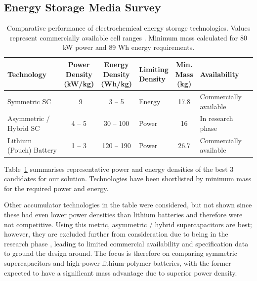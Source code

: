 \documentclass[11pt, a4paper]{report}
\numberwithin{equation}{section}
\begin{document}
\subsection{Energy Storage Media Survey}

\begin{table}[htbp]
    \centering
    \caption{Comparative performance of electrochemical energy storage technologies. Values represent commercially available cell ranges \cite{kalaiarasi2024tale}. Minimum mass calculated for 80 kW power and 89 Wh energy requirements.}
    \label{tab:storage_comparison}
    \footnotesize
    \begin{tabular}{|l|c|c|l|c|l|}
        \hline
        \textbf{Technology} & \makecell{\textbf{Power} \\ \textbf{Density} \\ \textbf{(kW/kg)}} & \makecell{\textbf{Energy} \\ \textbf{Density} \\ \textbf{(Wh/kg)}} & \makecell{\textbf{Limiting} \\ \textbf{Density}} & \makecell{\textbf{Min.} \\ \textbf{Mass} \\ \textbf{(kg)}} & \textbf{Availability} \\
        \hline
        Symmetric SC & ~9 & 3 -- 5 & Energy & 17.8 & Commercially available \\
        Asymmetric / Hybrid SC & 4 -- 5 & 30 -- 100 & Power & 16 & In research phase \\
        Lithium (Pouch) Battery & 1 -- 3 & 120 -- 190 & Power & 26.7 & Commercially available \\
        \hline
    \end{tabular}
\end{table}

Table~\ref{tab:storage_comparison} summarises representative power and energy densities of the best 3 candidates for our solution. Technologies have been shortlisted by minimum mass for the required power and energy.

Other accumulator technologies in the table were considered, but not shown since these had even lower power densities than lithium batteries and therefore were not competitive.
Using this metric, asymmetric / hybrid supercapacitors are best; however, they are excluded further from consideration due to being in the research phase \cite{kalaiarasi2024tale}, leading to limited commercial availability and specification data to ground the design around. The focus is therefore on comparing symmetric supercapacitors and high-power lithium-polymer batteries, with the former expected to have a significant mass advantage due to superior power density.
\end{document}
